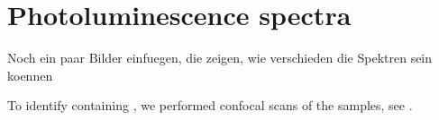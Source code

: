 
\section{Photoluminescence spectra} \label{sec::spectra}

\begin{remark}

	Noch ein paar Bilder einfuegen, die zeigen, wie verschieden die Spektren sein koennen

\end{remark}

	To identify \nds containing \sivs, we performed confocal scans of the samples, see .

	\begin{figure}[htp]
		\begin{subfigure}[t]{ 0.49\linewidth}
			\centering
			\caption{}
			\label{subfig::scan_1}
		\end{subfigure}
		\hfill
		\begin{subfigure}[t]{ 0.49\linewidth}
			\centering

\end{subfigure}
\end{figure}
